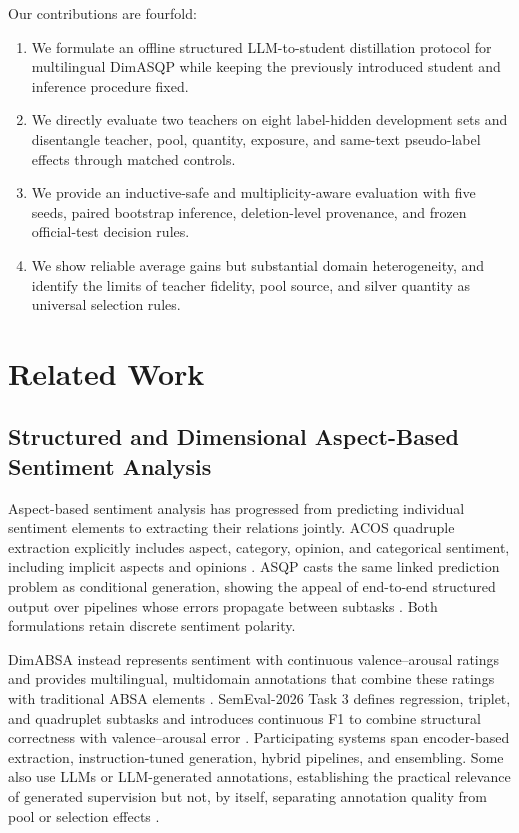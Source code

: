 Our contributions are fourfold:

\begin{enumerate}
\def\labelenumi{\arabic{enumi}.}
\tightlist
\item
  We formulate an offline structured LLM-to-student distillation
  protocol for multilingual DimASQP while keeping the previously
  introduced student and inference procedure fixed.
\item
  We directly evaluate two teachers on eight label-hidden development
  sets and disentangle teacher, pool, quantity, exposure, and same-text
  pseudo-label effects through matched controls.
\item
  We provide an inductive-safe and multiplicity-aware evaluation with
  five seeds, paired bootstrap inference, deletion-level provenance, and
  frozen official-test decision rules.
\item
  We show reliable average gains but substantial domain heterogeneity,
  and identify the limits of teacher fidelity, pool source, and silver
  quantity as universal selection rules.
\end{enumerate}

\section{Related Work}\label{related-work}

\subsection{Structured and Dimensional Aspect-Based Sentiment
Analysis}\label{structured-and-dimensional-aspect-based-sentiment-analysis}

Aspect-based sentiment analysis has progressed from predicting
individual sentiment elements to extracting their relations jointly.
ACOS quadruple extraction explicitly includes aspect, category, opinion,
and categorical sentiment, including implicit aspects and opinions
\citep{cai2021acos}. ASQP casts the same linked prediction problem as
conditional generation, showing the appeal of end-to-end structured
output over pipelines whose errors propagate between subtasks
\citep{zhang2021asqp}. Both formulations retain discrete sentiment
polarity.

DimABSA instead represents sentiment with continuous valence--arousal
ratings and provides multilingual, multidomain annotations that combine
these ratings with traditional ABSA elements \citep{lee2026dimabsa}.
SemEval-2026 Task 3 defines regression, triplet, and quadruplet subtasks
and introduces continuous F1 to combine structural correctness with
valence--arousal error \citep{yu2026semeval}. Participating systems span
encoder-based extraction, instruction-tuned generation, hybrid
pipelines, and ensembling. Some also use LLMs or LLM-generated
annotations, establishing the practical relevance of generated
supervision but not, by itself, separating annotation quality from pool
or selection effects \citep{alshawi2026classics}.

